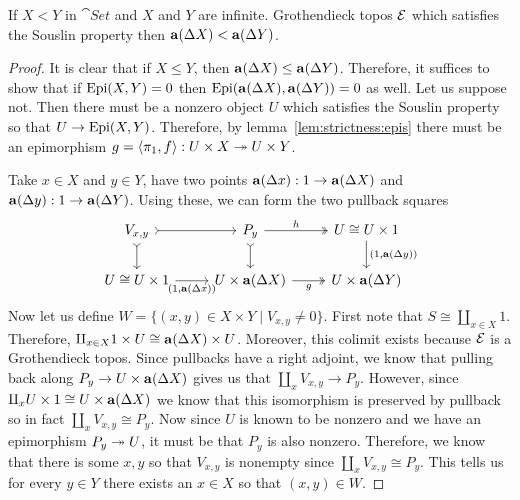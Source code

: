 \begin{lem}\label{lem:strictness:souslin}
  If $X < Y$ in $\cat{Set}$ and $X$ and $Y$ are infinite. Grothendieck
  topos $\mathcal{E}$ which satisfies the Souslin property then
  $\mathbf{a}(\Delta X) < \mathbf{a}(\Delta Y)$.
\end{lem}
\begin{proof}
  It is clear that if $X \le Y$, then
  $\mathbf{a}(\Delta X) \le \mathbf{a}(\Delta Y)$. Therefore, it
  suffices to show that if $\operatorname{Epi}(X, Y) = 0$ then
  $\operatorname{Epi}(\mathbf{a}(\Delta X), \mathbf{a}(\Delta Y)) = 0$ as well. Let
  us suppose not. Then there must be a nonzero object $U$ which
  satisfies the Souslin property so that $U \to \operatorname{Epi}(X, Y)$.
  Therefore, by lemma~\ref{lem:strictness:epis} there must be an
  epimorphism
  $g = \langle \pi_1, f \rangle : U \times X \twoheadrightarrow U \times Y$.

  Take $x \in X$ and $y \in Y$, have two points
  $\mathbf{a}(\Delta x) : 1 \to \mathbf{a}(\Delta X)$ and
  $\mathbf{a}(\Delta y) : 1 \to \mathbf{a}(\Delta Y)$. Using these, we
  can form the two pullback squares
  \[
    \begin{tikzcd}
      V_{x, y} \ar[d, rightarrowtail] \ar[r, rightarrowtail] &
      P_y \ar[d, rightarrowtail] \ar[r, "h", twoheadrightarrow] &
      {U \cong U \times 1} \ar[d, "{(1, \sheafify(\Delta y))}"]\\
      {U \cong U \times 1} \ar[r, "{(1, \sheafify(\Delta x))}", swap]&
      U \times \sheafify(\Delta X) \ar[r, "g", twoheadrightarrow, swap]&
      U \times \sheafify(\Delta Y)
    \end{tikzcd}
  \]
  Now let us define
  $W = \{(x, y) \in X \times Y \mid V_{x, y} \neq 0\}$. First note
  that $S \cong \amalg_{x \in X} 1$. Therefore,
  $\amalg_{x \in X} 1 \times U \cong \mathbf{a}(\Delta X) \times U$.
  Moreover, this colimit exists because $\mathcal{E}$ is a Grothendieck
  topos. Since pullbacks have a right adjoint, we know that pulling
  back along $P_y \to U \times \mathbf{a}(\Delta X)$ gives us that
  $\amalg_x V_{x, y} \to P_y$. However, since
  $\amalg_x U \times 1 \cong U \times \mathbf{a}(\Delta X)$ we know
  that this isomorphism is preserved by pullback so in fact
  $\amalg_x V_{x, y} \cong P_y$. Now since $U$ is known to be nonzero
  and we have an epimorphism $P_y \twoheadrightarrow U$, it must be that $P_y$ is
  also nonzero. Therefore, we know that there is some $x, y$ so that
  $V_{x, y}$ is nonempty since $\amalg_x V_{x, y} \cong P_y$. This
  tells us for every $y \in Y$ there exists an $x \in X$ so that
  $(x, y) \in W$.


\end{proof}

